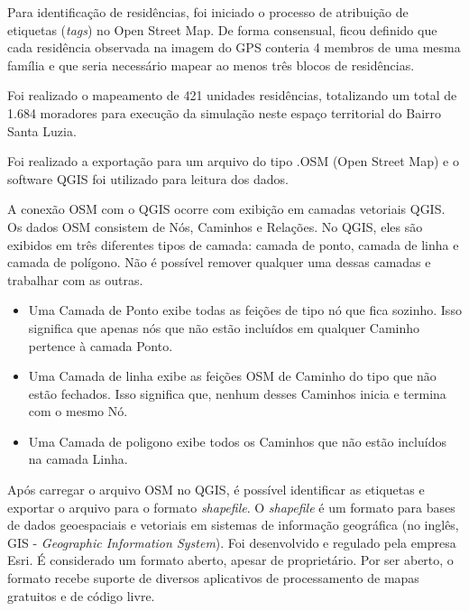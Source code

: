 
Para identificação de residências, foi iniciado o processo de atribuição de etiquetas (\textit{tags}) no Open Street Map. De forma consensual, ficou definido que cada residência observada na imagem do GPS conteria 4 membros de uma mesma família e que seria necessário mapear ao menos três blocos de residências.


Foi realizado o mapeamento de 421 unidades residências, totalizando um total de 1.684 moradores para execução da simulação neste espaço territorial do Bairro Santa Luzia.

Foi realizado a exportação para um arquivo do tipo .OSM (Open Street Map) e o software QGIS foi utilizado para leitura dos dados. 



A conexão OSM com o QGIS ocorre com exibição em camadas vetoriais QGIS. Os dados OSM consistem de Nós, Caminhos e Relações. No QGIS, eles são exibidos em três diferentes tipos de camada: camada de ponto, camada de linha e camada de polígono. Não é possível remover qualquer uma dessas camadas e trabalhar com as outras. \cite{OpenStre2:online}

\begin{itemize}
\item Uma Camada de Ponto exibe todas as feições de tipo nó que fica sozinho. Isso significa que apenas nós que não estão incluídos em qualquer Caminho pertence à camada Ponto.
\item Uma Camada de linha exibe as feições OSM de Caminho do tipo que não estão fechados. Isso significa que, nenhum desses Caminhos inicia e termina com o mesmo Nó.
\item Uma Camada de poligono exibe todos os Caminhos que não estão incluídos na camada Linha.
\end{itemize}

Após carregar o arquivo OSM no QGIS, é possível identificar as etiquetas e exportar o arquivo para o formato \textit{shapefile}. O \textit{shapefile} é um formato para bases de dados geoespaciais e vetoriais em sistemas de informação geográfica (no inglês, GIS - \textit{Geographic Information System}). Foi desenvolvido e regulado pela empresa Esri. É considerado um formato aberto, apesar de proprietário. Por ser aberto, o formato recebe suporte de diversos aplicativos de processamento de mapas gratuitos e de código livre. 

